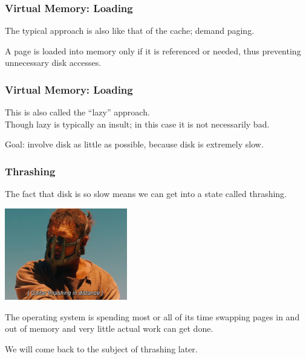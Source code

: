 \begin{frame}
\frametitle{Virtual Memory: Loading}

The typical approach is also like that of the cache; demand paging. 

A page is loaded into memory only if it is referenced or needed, thus preventing unnecessary disk accesses. 

\end{frame}

\begin{frame}
\frametitle{Virtual Memory: Loading}

This is also called the ``lazy'' approach.\\
\quad Though lazy is typically an insult; in this case it is not necessarily bad.  

Goal: involve disk as little as possible, because disk is extremely slow.


\end{frame}

\begin{frame}
\frametitle{Thrashing}

The fact that disk is so slow means we can get into a state called \alert{thrashing}. 

\begin{center}
	\includegraphics[width=0.4\textwidth]{images/thrashing2.png}
\end{center}

The operating system is spending most or all of its time swapping pages in and out of memory and very little actual work can get done.

We will come back to the subject of thrashing later.

\end{frame}


